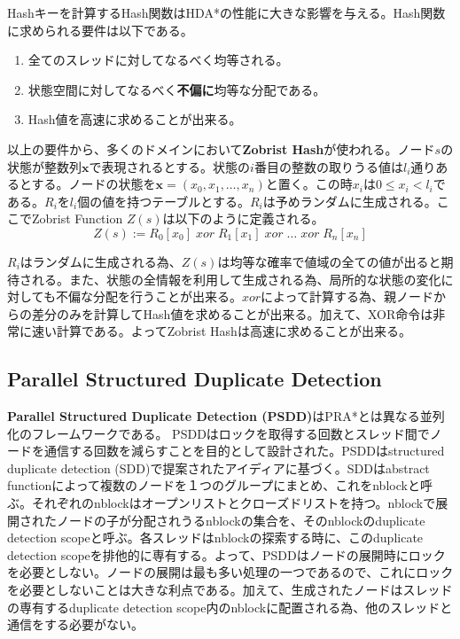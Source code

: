 \documentclass[uplatex]{jsarticle}
\begin{document}
\vspace{3mm}

Hashキーを計算するHash関数はHDA*の性能に大きな影響を与える。Hash関数に求められる要件は以下である。

\begin{enumerate}
	\item 全てのスレッドに対してなるべく均等される。
	\item 状態空間に対してなるべく\textbf{不偏に}均等な分配である。
	\item Hash値を高速に求めることが出来る。
\end{enumerate}

以上の要件から、多くのドメインにおいて\textbf{Zobrist Hash}が使われる\cite{Zobrist1970}。ノード$s$の状態が整数列$\mathbf{x}$で表現されるとする。状態の$i$番目の整数の取りうる値は$l_{i}$通りあるとする。ノードの状態を$\mathbf{x} = (x_{0}, x_{1}, …, x_{n})$と置く。この時$x_{i}$は$0 \leq x_{i} < l_{i}$である。$R_{i}$を$l_{i}$個の値を持つテーブルとする。$R_{i}$は予めランダムに生成される。ここでZobrist Function $Z(s)$は以下のように定義される。
\newline
\begin{equation}
	Z(s) := R_{0}[x_{0}]\; xor\; R_{1}[x_{1}]\; xor\; …\; xor\; R_{n}[x_{n}]%
\end{equation}

$R_{i}$はランダムに生成される為、$Z(s)$は均等な確率で値域の全ての値が出ると期待される。また、状態の全情報を利用して生成される為、局所的な状態の変化に対しても不偏な分配を行うことが出来る。$xor$によって計算する為、親ノードからの差分のみを計算してHash値を求めることが出来る。加えて、XOR命令は非常に速い計算である。よってZobrist Hashは高速に求めることが出来る。


\subsection{Parallel Structured Duplicate Detection}
\textbf{Parallel Structured Duplicate Detection (PSDD)}はPRA*とは異なる並列化のフレームワークである\cite{zhou2007parallel}。
PSDDはロックを取得する回数とスレッド間でノードを通信する回数を減らすことを目的として設計された。PSDDはstructured duplicate detection (SDD)で提案されたアイディアに基づく\cite{zhou2004structured}。SDDはabstract functionによって複数のノードを１つのグループにまとめ、これをnblockと呼ぶ。それぞれのnblockはオープンリストとクローズドリストを持つ。nblockで展開されたノードの子が分配されうるnblockの集合を、そのnblockのduplicate detection scopeと呼ぶ。各スレッドはnblockの探索する時に、このduplicate detection scopeを排他的に専有する。よって、PSDDはノードの展開時にロックを必要としない。ノードの展開は最も多い処理の一つであるので、これにロックを必要としないことは大きな利点である。加えて、生成されたノードはスレッドの専有するduplicate detection scope内のnblockに配置される為、他のスレッドと通信をする必要がない。
\end{document}
